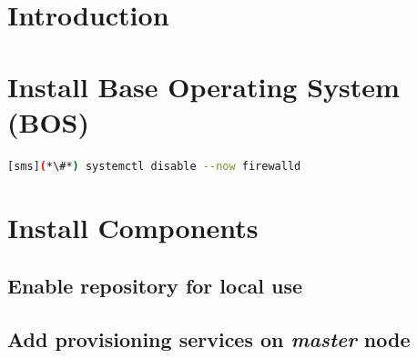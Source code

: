\documentclass{ohpc-doc}
\begin{document}

\chapter{Introduction} \label{sec:introduction}









\chapter{Install Base Operating System (BOS)}


\begin{lstlisting}[language=bash,keywords={}]
[sms](*\#*) systemctl disable --now firewalld
\end{lstlisting}


\chapter{Install \OHPC{} Components} \label{sec:basic_install}


\section{Enable \OHPC{} repository for local use} \label{sec:enable_repo}




\section{Add provisioning services on {\em master} node} \label{sec:add_provisioning}



\end{document}
